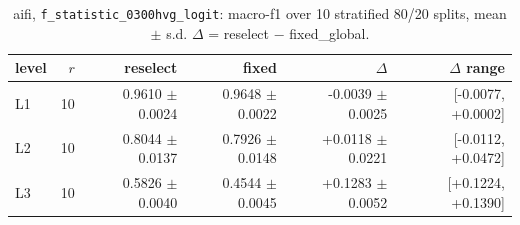 \begin{table}[t]
\centering
\small
\begin{tabular}{lrrrrr}
\toprule
level & $r$ & reselect & fixed & $\Delta$ & $\Delta$ range \\
\midrule
L1 & 10 & 0.9610 $\pm$ 0.0024 & 0.9648 $\pm$ 0.0022 & -0.0039 $\pm$ 0.0025 & [-0.0077, +0.0002] \\
L2 & 10 & 0.8044 $\pm$ 0.0137 & 0.7926 $\pm$ 0.0148 & +0.0118 $\pm$ 0.0221 & [-0.0112, +0.0472] \\
L3 & 10 & 0.5826 $\pm$ 0.0040 & 0.4544 $\pm$ 0.0045 & +0.1283 $\pm$ 0.0052 & [+0.1224, +0.1390] \\
\bottomrule
\end{tabular}
\caption{aifi, \texttt{f\_statistic\_0300hvg\_logit}: macro-f1 over 10 stratified 80/20 splits, mean $\pm$ s.d. $\Delta$ = reselect $-$ fixed\_global.}
\label{tab:repeats-aifi-macro_f1}
\end{table}